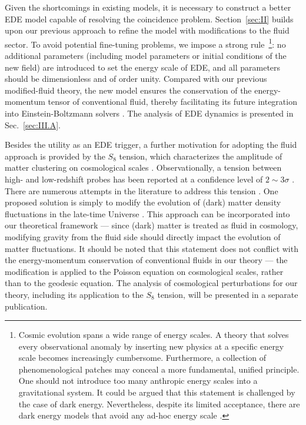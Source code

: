 \documentclass[aps,prd,twocolumn]{revtex4-2}
\begin{document}
Given the shortcomings in existing models, it is necessary to construct a better EDE model capable of resolving the coincidence problem. Section~\ref{sec:II} builds upon our previous approach \cite{Tian2021.PRD.103.043518,Tian2023.PRD.107.103507} to refine the model with modifications to the fluid sector. To avoid potential fine-tuning problems, we impose a strong rule~\footnote{Cosmic evolution spans a wide range of energy scales. A theory that solves every observational anomaly by inserting new physics at a specific energy scale becomes increasingly cumbersome. Furthermore, a collection of phenomenological patches may conceal a more fundamental, unified principle. One should not introduce too many anthropic energy scales into a gravitational system. It could be argued that this statement is challenged by the case of dark energy. Nevertheless, despite its limited acceptance, there are dark energy models that avoid any ad-hoc energy scale \cite{Dodelson2000.PRL.85.5276,Tian2020.PRD.101.063531}.}: no additional parameters (including model parameters or initial conditions of the new field) are introduced to set the energy scale of EDE, and all parameters should be dimensionless and of order unity. Compared with our previous modified-fluid theory, the new model ensures the conservation of the energy-momentum tensor of conventional fluid, thereby facilitating its future integration into Einstein-Boltzmann solvers \cite{Lewis2000.ApJ.538.473,Blas2011.JCAP.07.034}. The analysis of EDE dynamics is presented in Sec.~\ref{sec:III.A}.

Besides the utility as an EDE trigger, a further motivation for adopting the fluid approach is provided by the $S_8$ tension, which characterizes the amplitude of matter clustering on cosmological scales \cite{Peebles1980.book,Martinez2002.book}. Observationally, a tension between high- and low-redshift probes has been reported at a confidence level of $2\sim3\sigma$ \cite{Ade2016.AaA.594.A24,Aghanim2020.AaA.641.A6,Asgari2021.AaA.645.A104,Abbott2022.PRD.105.023520,NoS8Tension}. There are numerous attempts in the literature to address this tension \cite{DiValentino2025.PhysDarkUniverse.49.101965}. One proposed solution is simply to modify the evolution of (dark) matter density fluctuations in the late-time Universe \cite{Poulin2023.PRD.107.123538,Lin2024.PRD.109.063523}. This approach can be incorporated into our theoretical framework --- since (dark) matter is treated as fluid in cosmology, modifying gravity from the fluid side should directly impact the evolution of matter fluctuations. It should be noted that this statement does not conflict with the energy-momentum conservation of conventional fluids in our theory --- the modification is applied to the Poisson equation on cosmological scales, rather than to the geodesic equation. The analysis of cosmological perturbations for our theory, including its application to the $S_8$ tension, will be presented in a separate publication.
\end{document}
